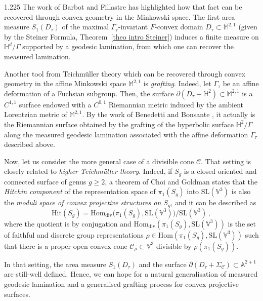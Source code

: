 \documentclass[reqno, a4paper]{amsart}
\numberwithin{equation}{section}
\numberwithin{figure}{section}
\theoremstyle{definition}
\theoremstyle{remark}
\newcommand{\V}{\mathbb{V}} %
\newcommand{\A}{\mathbb{A}} %
\newcommand{\M}{\mathbb{M}} %
\renewcommand{\H}{\mathbb{H}} %
\newcommand{\SL}{\mathrm{SL}} %
\newcommand{\C}{\mathcal{C}} %
\renewcommand{\S}{\Sigma_\C} %
\newcommand{\bp}[1]{{\bigl( {#1} \bigr)}} %
\begin{document}
\begin{spacing}{1.225}
The work of Barbot and Fillastre \cite{Barbot_Fillastre_20} has highlighted how that fact can be recovered through convex geometry in the Minkowski space. The first area measure $S_1(D_\tau)$ of the maximal $\Gamma_\tau$-invariant $F$-convex domain $D_\tau \subset \M^{2,1}$ (given by the Steiner Formula, Theorem~\ref{theo intro Steiner}) induces a finite measure on $\H^d/\Gamma$ supported by a geodesic lamination, from which one can recover the measured lamination.

Another tool from Teichm\"uller theory which can be recovered through convex geometry in the affine Minkowski space $\M^{2,1}$ is \emph{grafting}. Indeed, let $\Gamma_\tau$ be an affine deformation of a Fuchsian subgroup. Then, the surface $\partial(D_\tau+\H^2) \subset \M^{2,1}$ is a $C^{1,1}$ surface endowed with a $C^{0,1}$ Riemannian metric induced by the ambient Lorentzian metric of $\M^{2,1}$. By the work of Benedetti and Bonsante \cite{Benedetti_Bonsante_09}, it actually is the Riemannian surface obtained by the grafting of the hyperbolic surface $\H^{2}/\Gamma$ along the measured geodesic lamination associated with the affine deformation $\Gamma_\tau$ described above.


Now, let us consider the more general case of a divisible cone $\C$. That setting is closely related to \emph{higher Teichm\"uller theory}. Indeed, if $S_g$ is a closed oriented and connected surface of genus $g \geq 2$,  a theorem of Choi and Goldman \cite{Choi_Goldman_93} states that the \emph{Hitchin component} \cite{Hitchin_92} of the representation space of $\pi_1(S_g)$ into $\SL(\V^3)$ is also the \emph{moduli space of convex projective structures on $S_g$}, and it can be described as 
\begin{equation*}
\mathrm{Hit}(S_g) = \mathrm{Hom}_{\mathrm{div}} \bp{\pi_1(S_g), \SL(\V^3)} \Big/\SL(\V^3) \, ,
\end{equation*}
where the quotient is by conjugation and $\mathrm{Hom}_{\mathrm{div}} (\pi_1(S_g), \SL(\V^3))$ is the set of faithful and discrete group representations $\rho \in \mathrm{Hom}(\pi_1(S_g) , \SL(\V^3))$ such that there is a proper open convex cone $\C_\rho \subset \V^3$ divisible by $\rho(\pi_1(S_g))$. 

In that setting, the area measure $S_1(D_\tau)$ and the surface $\partial(D_\tau+\S) \subset \A^{2+1}$ are still-well defined. Hence, we can hope for a natural generalisation of measured geodesic lamination and a generalised grafting process for convex projective surfaces. 


\end{spacing}
\end{document}
